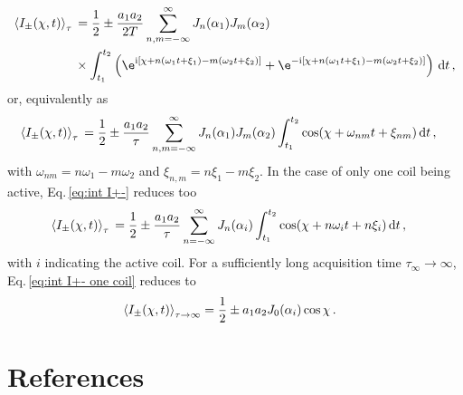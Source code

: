 \documentclass[12pt]{iopart}
\newcommand{\eq}{Eq.}
\newcommand{\I}{\mathrm{i}}
\begin{document}
\begin{align}
\begin{aligned}
   \braket{I_\pm(\chi, t)}_{\tau} \, &=\frac{1}{2} \pm \frac{a_1 a_2}{2 T} \sum_{n,m=-\infty}^\infty J_n(\alpha_1)J_m(\alpha_2) \\ & \times \int_{t_1}^{t_2} \left( \e^{\I[\chi+n(\omega_1 t+\xi_1) - m(\omega_2 t+\xi_2)]} + \e^{-\I[\chi+n(\omega_1 t+\xi_1) - m(\omega_2 t+\xi_2)]}\right)\,\mathrm{d}t \,,
\end{aligned}
\end{align}
or, equivalently as
\begin{align}
\begin{aligned}
   \braket{I_\pm(\chi, t)}_{\tau} \, &= \frac{1}{2} \pm \frac{a_1 a_2}{\tau} \sum_{n,m=-\infty}^\infty J_n(\alpha_1)J_m(\alpha_2) \int_{t_1}^{t_2} \cos(\chi +\omega_{nm} t + \xi_{nm})
     \, \mathrm{d}t \,,
\end{aligned}
\end{align}
with $\omega_{nm}=n \omega_1 - m \omega_2$ and $\xi_{n,m}=n \xi_1 - m \xi_2$. In the case of only one coil being active, \eq\,\eqref{eq:int I+-} reduces too
\begin{align}
\begin{aligned}
   \braket{I_\pm(\chi, t)}_{\tau} \, &= \frac{1}{2} \pm \frac{a_1 a_2}{\tau} \sum_{n=-\infty}^\infty J_n(\alpha_i) \int_{t_1}^{t_2} \cos(\chi +n \omega_i t + n \xi_i)
     \, \mathrm{d}t \,,
\end{aligned} \label{eq:int I+- one coil}
\end{align}
with $i$ indicating the active coil. For a sufficiently long acquisition time $\tau_\infty\rightarrow\infty$, \eq\,\eqref{eq:int I+- one coil} reduces to
\begin{align}
\begin{aligned}   
    &\braket{I_\pm(\chi, t)}_{\tau\rightarrow\infty} = \frac{1}{2} \pm a_1 a_2 J_0(\alpha_i) \cos \chi \, .
\end{aligned} \label{eq:int_I+-_T_inf_app}
\end{align}
\section*{References}

\end{document}
